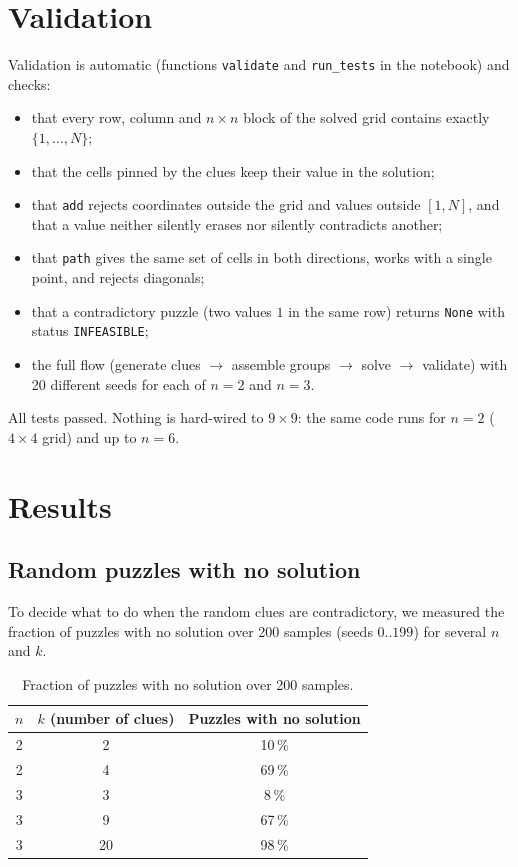 \documentclass[11pt,a4paper]{article}
\begin{document}
\section{Validation}\label{sec:valid}

Validation is automatic (functions \texttt{validate} and \texttt{run\_tests} in the notebook) and checks:

\begin{itemize}
  \item that every row, column and $n\times n$ block of the solved grid contains exactly $\{1,\dots,N\}$;
  \item that the cells pinned by the clues keep their value in the solution;
  \item that \texttt{add} rejects coordinates outside the grid and values outside $[1,N]$, and that a value neither silently erases nor silently contradicts another;
  \item that \texttt{path} gives the same set of cells in both directions, works with a single point, and rejects diagonals;
  \item that a contradictory puzzle (two values $1$ in the same row) returns \texttt{None} with status \texttt{INFEASIBLE};
  \item the full flow (generate clues $\to$ assemble groups $\to$ solve $\to$ validate) with 20 different seeds for each of $n=2$ and $n=3$.
\end{itemize}

All tests passed. Nothing is hard-wired to $9\times 9$: the same code runs for $n=2$ ($4\times 4$ grid) and up to $n=6$.

\section{Results}\label{sec:results}

\subsection{Random puzzles with no solution}

To decide what to do when the random clues are contradictory, we measured the fraction of puzzles with no solution over 200 samples (seeds $0..199$) for several $n$ and $k$.

\begin{table}[h]
\centering
\begin{tabular}{ccc}
\toprule
$n$ & $k$ (number of clues) & Puzzles with no solution \\
\midrule
2 & 2  & 10\,\% \\
2 & 4  & 69\,\% \\
3 & 3  & 8\,\%  \\
3 & 9  & 67\,\% \\
3 & 20 & 98\,\% \\
\bottomrule
\end{tabular}
\caption{Fraction of puzzles with no solution over 200 samples.}
\label{tab:imposs}
\end{table}
\end{document}
